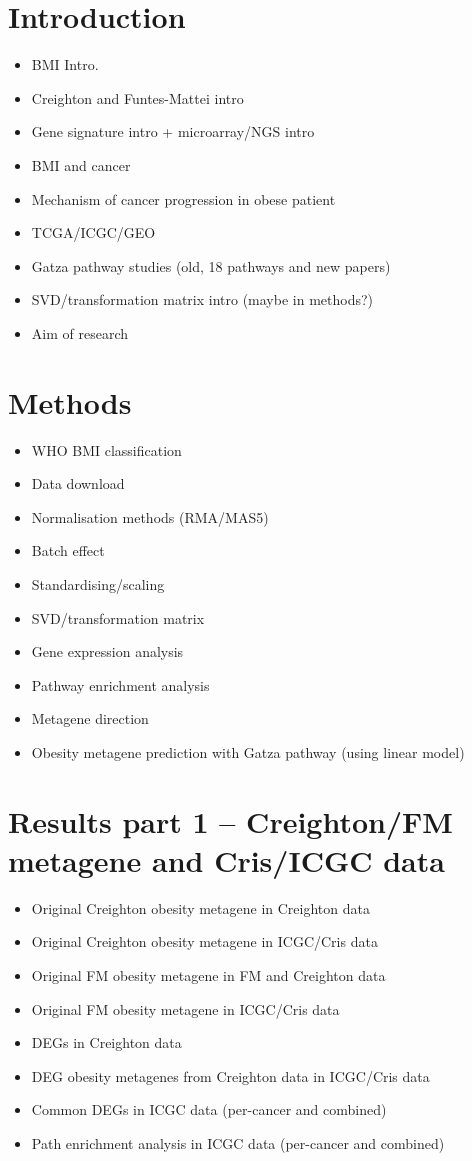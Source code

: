 \documentclass[a4paper, 10pt]{article}
\begin{document}
	\section*{Introduction}
	\begin{itemize}
		\item BMI Intro.
		\item Creighton and Funtes-Mattei intro
		\item Gene signature intro + microarray/NGS intro
		\item BMI and cancer
		\item Mechanism of cancer progression in obese patient
		\item TCGA/ICGC/GEO
		\item Gatza pathway studies (old, 18 pathways and new papers)
		\item SVD/transformation matrix intro (maybe in methods?)
		\item Aim of research
	\end{itemize}
	\section*{Methods}
	\begin{itemize}
		\item WHO BMI classification
		\item Data download
		\item Normalisation methods (RMA/MAS5)
		\item Batch effect
		\item Standardising/scaling
		\item SVD/transformation matrix
		\item Gene expression analysis
		\item Pathway enrichment analysis
		\item Metagene direction
		\item Obesity metagene prediction with Gatza pathway (using linear model)
	\end{itemize}
	\section*{Results part 1 -- Creighton/FM metagene and Cris/ICGC data}
	\begin{itemize}
		\item Original Creighton obesity metagene in Creighton data
		\item Original Creighton obesity metagene in ICGC/Cris data
		\item Original FM obesity metagene in FM and Creighton data
		\item Original FM obesity metagene in ICGC/Cris data
		\item DEGs in Creighton data
		\item DEG obesity metagenes from Creighton data in ICGC/Cris data
		\item Common DEGs in ICGC data (per-cancer and combined)
		\item Path enrichment analysis in ICGC data (per-cancer and combined)
	\end{itemize}
\end{document}
